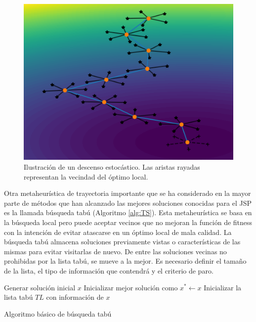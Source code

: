 \begin{figure}[H]
\centering
\includegraphics[scale=.8]{Imagenes/mettray.png}
    \caption{Ilustración de un descenso estocástico. Las aristas rayadas representan la vecindad del óptimo local.}
\end{figure}


Otra metaheurística de trayectoria importante que se ha considerado en la mayor parte de métodos que han alcanzado las mejores soluciones conocidas para el JSP es
la llamada búsqueda tabú (Algoritmo \ref{alg:TS}).
%
Esta metaheurística se basa en la búsqueda local pero puede aceptar vecinos que no mejoran la función de fitness con la intención de evitar atascarse en un óptimo 
local de mala calidad. 
%
La búsqueda tabú almacena soluciones previamente vistas o características de las mismas para evitar visitarlas de nuevo. 
%
De entre las soluciones vecinas no prohibidas por la lista tabú, se mueve a la mejor.
%
Es necesario definir el tamaño de la lista, el tipo de información que contendrá y el criterio de paro.

\begin{algorithm}[H]
 Generar solución inicial $x$\;
    Inicializar mejor solución como $x^*\leftarrow x$
 Inicializar la lista tabú $TL$ con información de $x$ \; 
    \label{alg:TS}
    \caption{Algoritmo básico de búsqueda tabú}
\end{algorithm}

